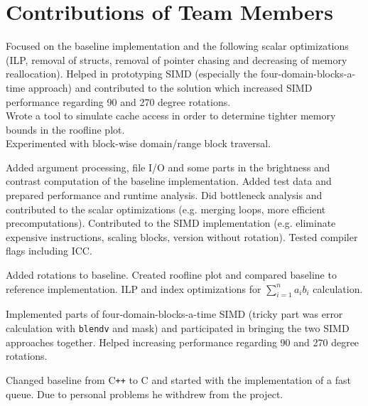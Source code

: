 \section{Contributions of Team Members}

 Focused on the baseline implementation and the following scalar optimizations
(ILP, removal of structs, removal of pointer chasing and decreasing of memory reallocation).
Helped in prototyping SIMD (especially the four-domain-blocks-a-time approach)
and contributed to the solution which increased SIMD performance regarding 90 and 270 degree rotations.\\
Wrote a tool to simulate cache access in order to determine tighter memory bounds in the roofline plot.\\
Experimented with block-wise domain/range block traversal.

 Added argument processing, file I/O and some parts in the
brightness and contrast computation of the baseline implementation. Added test
data and prepared performance and runtime analysis. Did bottleneck analysis and
contributed to the scalar optimizations (e.g. merging loops, more efficient
precomputations). Contributed to the SIMD implementation (e.g. eliminate
expensive instructions, scaling blocks, version without rotation). Tested
compiler flags including ICC.

 Added rotations to baseline. Created roofline plot and compared baseline to reference
implementation. ILP and index optimizations for $\sum_{i=1}^n a_i b_i$ calculation.

Implemented parts of four-domain-blocks-a-time SIMD (tricky part was error calculation with
\verb|blendv| and mask) and participated in bringing the two SIMD approaches together.
Helped increasing performance regarding 90 and 270 degree rotations.

 Changed baseline from C\texttt{++} to C and started with the implementation of a fast queue.
Due to personal problems he withdrew from the project.
